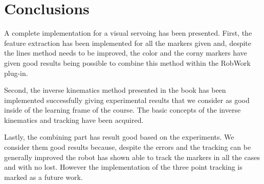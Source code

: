 \chapter{Conclusions} %
\label{chap:conclusions}
A complete implementation for a visual servoing has been presented. First, the feature extraction has been implemented for all the markers given and, despite the lines method needs to be improved, the color and the corny markers have given good results being possible to combine this method within the RobWork plug-in.

Second, the inverse kinematics method presented in the book has been implemented successfully giving experimental results that we consider as good inside of the learning frame of the course. The basic concepts of the inverse kinematics and tracking have been acquired.

Lastly, the combining part has result good based on the experiments. We consider them good results because, despite the errors and the tracking can be generally improved the robot has shown able to track the markers in all the cases and with no lost. However the implementation of the three point tracking is marked as a future work.

